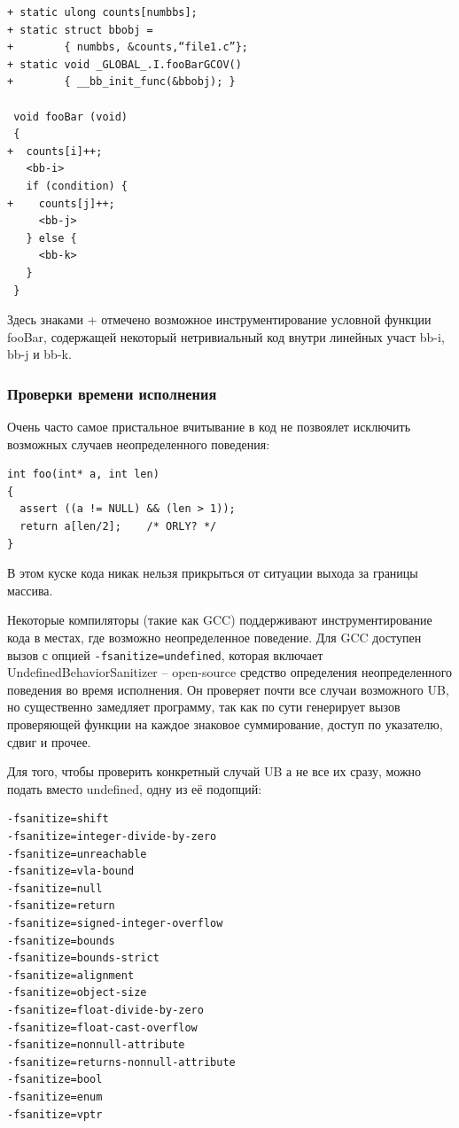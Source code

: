 \documentclass[a4paper,12pt,oneside]{article}
\begin{document}
\begin{lstlisting}
+ static ulong counts[numbbs];
+ static struct bbobj =
+        { numbbs, &counts,“file1.c”};
+ static void _GLOBAL_.I.fooBarGCOV()
+        { __bb_init_func(&bbobj); }

 void fooBar (void)
 {
+  counts[i]++;
   <bb-i>
   if (condition) {
+    counts[j]++;
     <bb-j>
   } else {
     <bb-k>
   }
 }
\end{lstlisting}

Здесь знаками + отмечено возможное инструментирование условной функции fooBar, содержащей некоторый нетривиальный код внутри линейных участ bb-i, bb-j и bb-k.

\subsubsection{Проверки времени исполнения}

Очень часто самое пристальное вчитывание в код не позвоялет исключить возможных случаев неопределенного поведения:

\begin{lstlisting}
int foo(int* a, int len) 
{
  assert ((a != NULL) && (len > 1));
  return a[len/2];    /* ORLY? */
}
\end{lstlisting}

В этом куске кода никак нельзя прикрыться от ситуации выхода за границы массива.

Некоторые компиляторы (такие как GCC) поддерживают инструментирование кода в местах, где возможно неопределенное поведение. Для GCC доступен вызов с опцией \lstinline!-fsanitize=undefined!, которая включает UndefinedBehaviorSanitizer -- open-source средство определения неопределенного поведения во время исполнения. Он проверяет почти все случаи возможного UB, но существенно замедляет программу, так как по сути генерирует вызов проверяющей функции на каждое знаковое суммирование, доступ по указателю, сдвиг и прочее.

Для того, чтобы проверить конкретный случай UB а не все их сразу, можно подать вместо undefined, одну из её подопций:

\begin{lstlisting}
-fsanitize=shift
-fsanitize=integer-divide-by-zero
-fsanitize=unreachable
-fsanitize=vla-bound
-fsanitize=null
-fsanitize=return
-fsanitize=signed-integer-overflow
-fsanitize=bounds
-fsanitize=bounds-strict
-fsanitize=alignment
-fsanitize=object-size
-fsanitize=float-divide-by-zero
-fsanitize=float-cast-overflow
-fsanitize=nonnull-attribute
-fsanitize=returns-nonnull-attribute
-fsanitize=bool
-fsanitize=enum
-fsanitize=vptr
\end{lstlisting}
\end{document}
